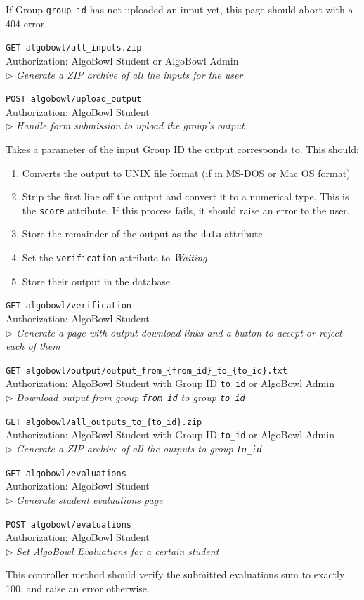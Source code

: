 \documentclass[12pt]{article}
\newcommand\ctrltitle[1]{\par\medskip\texttt{\large #1}\\}
\newcommand\ctrlauth[1]{Authorization: #1\\}
\newcommand\ctrldesc[1]{$\rhd$ \textsl{#1}\par\medskip}
\begin{document}
If Group \texttt{group\_id} has not uploaded an input yet, this page should
abort with a 404 error.

\ctrltitle{GET algobowl/all\_inputs.zip}
\ctrlauth{AlgoBowl Student or AlgoBowl Admin}
\ctrldesc{Generate a ZIP archive of all the inputs for the user}

\ctrltitle{POST algobowl/upload\_output}
\ctrlauth{AlgoBowl Student}
\ctrldesc{Handle form submission to upload the group's output}

Takes a parameter of the input Group ID the output corresponds to. This should:

\begin{enumerate}
    \item Converts the output to UNIX file format (if in MS-DOS or Mac OS format)
    \item Strip the first line off the output and convert it to a numerical
        type. This is the \texttt{score} attribute. If this process fails, it
        should raise an error to the user.
    \item Store the remainder of the output as the \texttt{data} attribute
    \item Set the \texttt{verification} attribute to \emph{Waiting}
    \item Store their output in the database
\end{enumerate}

\ctrltitle{GET algobowl/verification}
\ctrlauth{AlgoBowl Student}
\ctrldesc{Generate a page with output download links and a button to accept or
reject each of them}

\ctrltitle{GET algobowl/output/output\_from\_\{from\_id\}\_to\_\{to\_id\}.txt}
\ctrlauth{AlgoBowl Student with Group ID \texttt{to\_id} or AlgoBowl Admin}
\ctrldesc{Download output from group \texttt{from\_id} to group
\texttt{to\_id}}

\ctrltitle{GET algobowl/all\_outputs\_to\_\{to\_id\}.zip}
\ctrlauth{AlgoBowl Student with Group ID \texttt{to\_id} or AlgoBowl Admin}
\ctrldesc{Generate a ZIP archive of all the outputs to group \texttt{to\_id}}

\ctrltitle{GET algobowl/evaluations}
\ctrlauth{AlgoBowl Student}
\ctrldesc{Generate student evaluations page}

\ctrltitle{POST algobowl/evaluations}
\ctrlauth{AlgoBowl Student}
\ctrldesc{Set AlgoBowl Evaluations for a certain student}

This controller method should verify the submitted evaluations sum to exactly
100, and raise an error otherwise.
\end{document}
